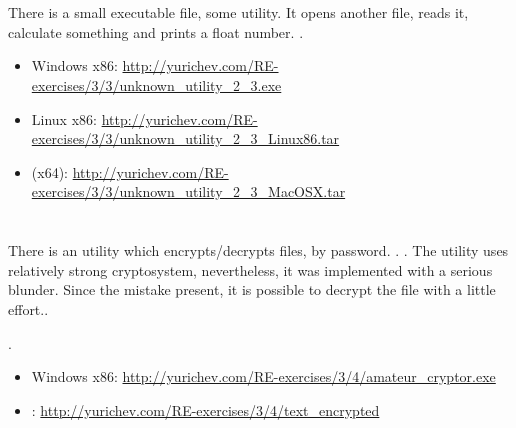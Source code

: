 \section{}

{There is a small executable file, some utility}.
{It opens another file, reads it, calculate something and prints a float number}.
.

\begin{itemize}
\item Windows x86: \url{http://yurichev.com/RE-exercises/3/3/unknown_utility_2_3.exe}
\item Linux x86: \url{http://yurichev.com/RE-exercises/3/3/unknown_utility_2_3_Linux86.tar}
\item \MacOSX (x64): \url{http://yurichev.com/RE-exercises/3/3/unknown_utility_2_3_MacOSX.tar}
\end{itemize}

\section{}

{There is an utility which encrypts/decrypts files, by password}.
.
.
{The utility uses relatively strong cryptosystem, nevertheless, it was implemented with a serious blunder.
Since the mistake present, it is possible to decrypt the file with a little effort.}.

.

\begin{itemize}
\item Windows x86: \url{http://yurichev.com/RE-exercises/3/4/amateur_cryptor.exe}

\item {}: \url{http://yurichev.com/RE-exercises/3/4/text_encrypted}
\end{itemize}

